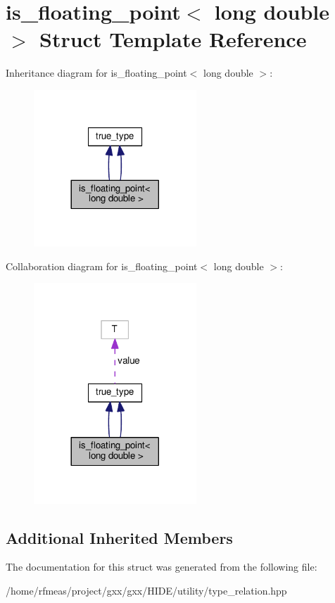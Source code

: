 \hypertarget{structis__floating__point_3_01long_01double_01_4}{}\section{is\+\_\+floating\+\_\+point$<$ long double $>$ Struct Template Reference}
\label{structis__floating__point_3_01long_01double_01_4}


Inheritance diagram for is\+\_\+floating\+\_\+point$<$ long double $>$\+:
\nopagebreak
\begin{figure}[H]
\begin{center}
\leavevmode
\includegraphics[width=173pt]{structis__floating__point_3_01long_01double_01_4__inherit__graph}
\end{center}
\end{figure}


Collaboration diagram for is\+\_\+floating\+\_\+point$<$ long double $>$\+:
\nopagebreak
\begin{figure}[H]
\begin{center}
\leavevmode
\includegraphics[width=173pt]{structis__floating__point_3_01long_01double_01_4__coll__graph}
\end{center}
\end{figure}
\subsection*{Additional Inherited Members}


The documentation for this struct was generated from the following file\+:\begin{DoxyCompactItemize}
\item 
/home/rfmeas/project/gxx/gxx/\+H\+I\+D\+E/utility/type\+\_\+relation.\+hpp\end{DoxyCompactItemize}
